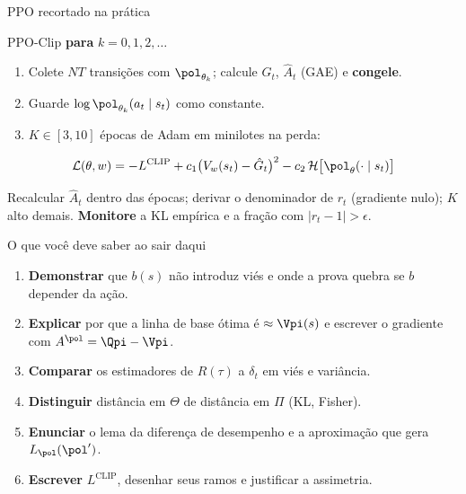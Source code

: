 \documentclass[aspectratio=169, 11pt]{beamer}
\newcommand{\Ahat}{\hat{A}}
\begin{document}
\begin{frame}{PPO recortado na prática}
  \begin{algbox}{PPO-Clip}
    \small
    \textbf{para} $k = 0, 1, 2, \dots$
    \begin{enumerate}\setlength{\itemsep}{0pt}
      \item Colete $NT$ transições com $\pol_{\theta_k}$; calcule $\hat G_t$, $\Ahat_t$ (GAE) e \textbf{congele}.
      \item Guarde $\log\pol_{\theta_k}(a_t\mid s_t)$ como constante.
      \item $K\in[3,10]$ épocas de Adam em minilotes na perda:
    \end{enumerate}
    \[
      \mathcal{L}(\theta,w) = -L^{\mathrm{CLIP}} + c_1\big(V_w(s_t) - \hat G_t\big)^2 - c_2\,\mathcal{H}\big[\pol_\theta(\cdot\mid s_t)\big]
    \]
  \end{algbox}
  \begin{alertabox}[title={Erros fatais}]
    Recalcular $\Ahat_t$ dentro das épocas; derivar o denominador de $r_t$ (gradiente nulo);
    $K$ alto demais. \textbf{Monitore} a KL empírica e a fração com $|r_t-1|>\epsilon$.
  \end{alertabox}
\end{frame}

\begin{frame}{O que você deve saber ao sair daqui}
  \begin{enumerate}\small\setlength{\itemsep}{0.35em}
    \item \textbf{Demonstrar} que $b(s)$ não introduz viés e onde a prova quebra se $b$ depender da ação.
    \item \textbf{Explicar} por que a linha de base ótima é $\approx\Vpi(s)$ e escrever o gradiente com
          $A^{\pol} = \Qpi - \Vpi$.
    \item \textbf{Comparar} os estimadores de $R(\tau)$ a $\delta_t$ em viés e variância.
    \item \textbf{Distinguir} distância em $\Theta$ de distância em $\Pi$ (KL, Fisher).
    \item \textbf{Enunciar} o lema da diferença de desempenho e a aproximação que gera $L_{\pol}(\pol')$.
    \item \textbf{Escrever} $L^{\mathrm{CLIP}}$, desenhar seus ramos e justificar a assimetria.
  \end{enumerate}
\end{frame}
\end{document}
